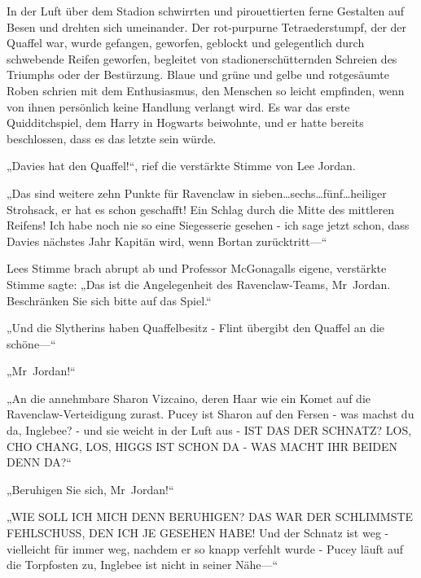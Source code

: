 {In der Luft über dem Stadion schwirrten und pirouettierten ferne Gestalten auf Besen und drehten sich umeinander. Der rot-purpurne Tetraederstumpf, der der Quaffel war, wurde gefangen, geworfen, geblockt und gelegentlich durch schwebende Reifen geworfen, begleitet von stadionerschütternden Schreien des Triumphs oder der Bestürzung. Blaue und grüne und gelbe und rotgesäumte Roben schrien mit dem Enthusiasmus, den Menschen so leicht empfinden, wenn von ihnen persönlich keine Handlung verlangt wird. Es war das erste Quidditchspiel, dem Harry in Hogwarts beiwohnte, und er hatte bereits beschlossen, dass es das letzte sein würde.

„Davies hat den Quaffel!“, rief die verstärkte Stimme von Lee Jordan.

„Das sind weitere zehn Punkte für Ravenclaw in sieben…sechs…fünf…heiliger Strohsack, er hat es schon geschafft! Ein Schlag durch die Mitte des mittleren Reifens! Ich habe noch nie so eine Siegesserie gesehen - ich sage jetzt schon, dass Davies nächstes Jahr Kapitän wird, wenn Bortan zurücktritt—“

Lees Stimme brach abrupt ab und Professor McGonagalls eigene, verstärkte Stimme sagte: „Das ist die Angelegenheit des Ravenclaw-Teams, Mr~Jordan. Beschränken Sie sich bitte auf das Spiel.“

„Und die Slytherins haben Quaffelbesitz - Flint übergibt den Quaffel an die schöne—“

„Mr~Jordan!“

„An die annehmbare Sharon Vizcaino, deren Haar wie ein Komet auf die Ravenclaw-Verteidigung zurast. Pucey ist Sharon auf den Fersen - was machst du da, Inglebee? - und sie weicht in der Luft aus - IST DAS DER SCHNATZ? LOS, CHO CHANG, LOS, HIGGS IST SCHON DA - WAS MACHT IHR BEIDEN DENN DA?“

„Beruhigen Sie sich, Mr~Jordan!“

„WIE SOLL ICH MICH DENN BERUHIGEN? DAS WAR DER SCHLIMMSTE FEHLSCHUSS, DEN ICH JE GESEHEN HABE! Und der Schnatz ist weg - vielleicht für immer weg, nachdem er so knapp verfehlt wurde - Pucey läuft auf die Torpfosten zu, Inglebee ist nicht in seiner Nähe—“

}
